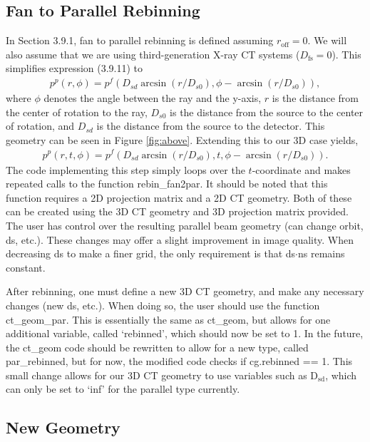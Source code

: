 \documentclass[12pt]{article}
\begin{document}
\subsection{Fan to Parallel Rebinning}

In Section 3.9.1, fan to parallel rebinning is defined assuming $r_{\mathrm{off}}=0$. We will also assume that we are using third-generation X-ray CT systems ($D_\mathrm{fs}=0$). This simplifies expression
(3.9.11) to
\begin{eqnarray*}
p^p(r,\phi) = p^f(D_{sd}\arcsin(r/D_{s0}),\phi-\arcsin(r/D_{s0})),
\end{eqnarray*}
where $\phi$ denotes the angle between the ray and the y-axis, $r$ is the distance from the center of rotation to the ray, $D_{s0}$ is the distance from the source to the center of rotation, and $D_{sd}$ is 
the distance from the source to the detector. This geometry can be seen in Figure \ref{fig:above}. Extending this to our 3D case yields, 
\begin{eqnarray*}
p^p(r,t,\phi) = p^f(D_{sd}\arcsin(r/D_{s0}),t,\phi-\arcsin(r/D_{s0})).
\end{eqnarray*}
The code implementing this step simply loops over the $t$-coordinate and makes
repeated calls to the function rebin\_fan2par.  It should be noted that this
function requires a 2D projection matrix and a 2D CT geometry.  Both of these
can be created using the 3D CT geometry and 3D projection matrix provided.
The user has control over the resulting parallel beam geometry (can change
orbit, ds, etc.). These changes may offer a slight improvement in image
quality.  When decreasing ds to make a finer grid, the only requirement is
that ds$\cdot$ns remains constant.

After rebinning, one must define a new 3D CT geometry, and make any necessary
changes (new ds, etc.). When doing so, the user should use the function
ct\_geom\_par.  This is essentially the same as ct\_geom, but allows for one
additional variable, called `rebinned', which should now be set to 1.  In the
future, the ct\_geom code should be rewritten to allow for a new type, called
par\_rebinned, but for now, the modified code checks if cg.rebinned == 1.
This small change allows for our 3D CT geometry to use variables such as
D$_\mathrm{sd}$, which can only be set to `inf' for the parallel type
currently.



\subsection{New Geometry}
\end{document}
